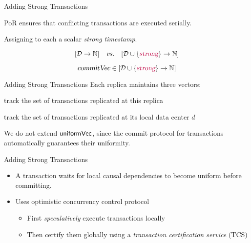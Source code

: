 
\begin{frame}{Adding Strong Transactions}
  \begin{center}
    PoR ensures that conflicting transactions are executed serially.

    \pause
    \vspace{0.50cm}
    Assigning to each  a scalar \emph{strong timestamp}.
  \end{center}

  \pause
  \vspace{0.30cm}
  \[
    [\mathcal{D} \to \mathbb{N}] \quad\text{\emph{vs.}}\quad [\mathcal{D} \cup \{\textcolor{purple}{\textsl{strong}}\} \to \mathbb{N}]
  \]

  \pause
  \[
    \textsl{commitVec} \in [\mathcal{D} \cup \{\textcolor{purple}{\textsl{strong}}\} \to \mathbb{N}]
  \]
\end{frame}

\begin{frame}{Adding Strong Transactions}
  Each replica maintains three vectors: \\[5pt]

  \begin{description} %
    \setlength{\itemsep}{10pt}
    \item[$\knownVC\text{[\strongcolor{\strongentry}]}$:] track the set of  transactions replicated at this replica
    \item[$\stableVC\text{[\strongcolor{\strongentry}]}$:] track the set of  transactions replicated at its local data center $d$
  \end{description}

  \vspace{0.50cm}
  We do not extend ${\sf uniformVec}$, since the commit protocol for
   transactions automatically guarantees their uniformity.
\end{frame}

\begin{frame}{Adding Strong Transactions}
  \begin{itemize}[<+->]
    \setlength{\itemsep}{8pt}
    \item A  transaction waits for local causal dependencies to
          become uniform before committing.
    \item Uses optimistic concurrency control protocol \\[6pt]
          \begin{itemize}
            \setlength{\itemsep}{6pt}
            \item First \emph{speculatively} execute  transactions locally
            \item Then certify them globally using a \emph{transaction certification service}
                  (TCS)
          \end{itemize}
  \end{itemize}
\end{frame}

